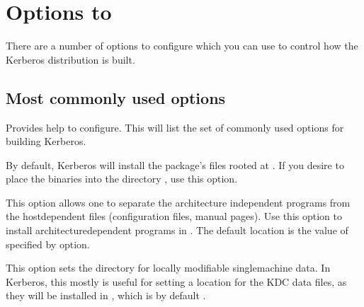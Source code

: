 \documentclass[letterpaper,10pt,english]{sphinxmanual}
\begin{document}
\sphinxstepscope


\section{Options to }
\label{\detokenize{build/options2configure:options-to-configure}}\label{\detokenize{build/options2configure:options2configure}}\label{\detokenize{build/options2configure::doc}}
\sphinxAtStartPar
There are a number of options to configure which you can use to
control how the Kerberos distribution is built.


\subsection{Most commonly used options}
\label{\detokenize{build/options2configure:most-commonly-used-options}}\begin{description}
\sphinxAtStartPar
Provides help to configure.  This will list the set of commonly
used options for building Kerberos.

\sphinxAtStartPar
By default, Kerberos will install the package’s files rooted at
.  If you desire to place the binaries into the
directory , use this option.

\sphinxAtStartPar
This option allows one to separate the architecture independent
programs from the host\sphinxhyphen{}dependent files (configuration files,
manual pages).  Use this option to install architecture\sphinxhyphen{}dependent
programs in .  The default location is the value of
specified by \sphinxstylestrong{\sphinxhyphen{}} option.

\sphinxAtStartPar
This option sets the directory for locally modifiable
single\sphinxhyphen{}machine data.  In Kerberos, this mostly is useful for
setting a location for the KDC data files, as they will be
installed in , which is by default
.


\end{description}
\end{document}
